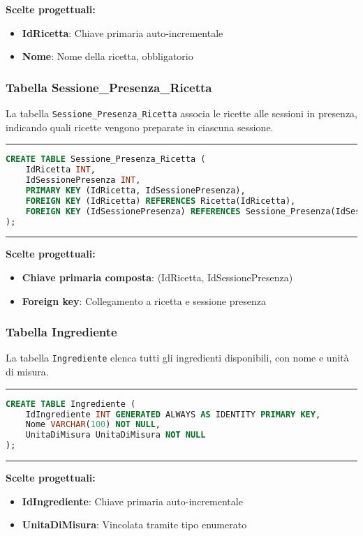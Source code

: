 \textbf{Scelte progettuali:}
\begin{itemize}
    \item \textbf{IdRicetta}: Chiave primaria auto-incrementale
    \item \textbf{Nome}: Nome della ricetta, obbligatorio
\end{itemize}

\subsubsection{Tabella Sessione\_Presenza\_Ricetta}

La tabella \texttt{Sessione\_Presenza\_Ricetta} associa le ricette alle sessioni in presenza, indicando quali ricette vengono preparate in ciascuna sessione.

\noindent\rule{\textwidth}{0.4pt}
\begin{lstlisting}[language=SQL, style=sqlstyle]
CREATE TABLE Sessione_Presenza_Ricetta (
    IdRicetta INT,
    IdSessionePresenza INT,
    PRIMARY KEY (IdRicetta, IdSessionePresenza),
    FOREIGN KEY (IdRicetta) REFERENCES Ricetta(IdRicetta),
    FOREIGN KEY (IdSessionePresenza) REFERENCES Sessione_Presenza(IdSessionePresenza)
);
\end{lstlisting}
\noindent\rule{\textwidth}{0.4pt}

\textbf{Scelte progettuali:}
\begin{itemize}
    \item \textbf{Chiave primaria composta}: (IdRicetta, IdSessionePresenza)
    \item \textbf{Foreign key}: Collegamento a ricetta e sessione presenza
\end{itemize}

\subsubsection{Tabella Ingrediente}

La tabella \texttt{Ingrediente} elenca tutti gli ingredienti disponibili, con nome e unità di misura.

\noindent\rule{\textwidth}{0.4pt}
\begin{lstlisting}[language=SQL, style=sqlstyle]
CREATE TABLE Ingrediente (
    IdIngrediente INT GENERATED ALWAYS AS IDENTITY PRIMARY KEY,
    Nome VARCHAR(100) NOT NULL,
    UnitaDiMisura UnitaDiMisura NOT NULL
);
\end{lstlisting}
\noindent\rule{\textwidth}{0.4pt}

\textbf{Scelte progettuali:}
\begin{itemize}
    \item \textbf{IdIngrediente}: Chiave primaria auto-incrementale
    \item \textbf{UnitaDiMisura}: Vincolata tramite tipo enumerato
\end{itemize}

